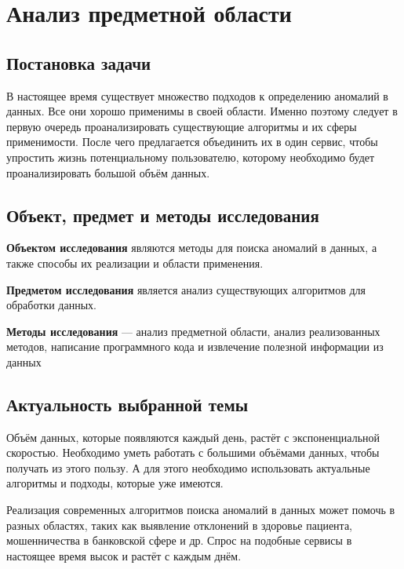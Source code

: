 \chapter{Анализ предметной области} \label{ch:ch1}

\section{Постановка задачи} \label{sec:ch1/sec1}

В настоящее время существует множество подходов к определению аномалий в данных. Все они хорошо применимы в своей области. Именно поэтому следует в первую очередь проанализировать существующие алгоритмы и их сферы применимости. После чего предлагается объединить их в один сервис, чтобы упростить жизнь потенциальному пользователю, которому необходимо будет проанализировать большой объём данных.

\clearpage

\section{Объект, предмет и методы исследования} \label{sec:ch1/sec2}

\textbf{Объектом исследования} являются методы для поиска аномалий в данных, а также способы их реализации и области применения.

\textbf{Предметом исследования} является анализ существующих алгоритмов для обработки данных.

\textbf{Методы исследования} — анализ предметной области, анализ реализованных методов, написание программного кода и извлечение полезной информации из данных

\clearpage

\section{Актуальность выбранной темы} \label{sec:ch1/sec3}

Объём данных, которые появляются каждый день, растёт с экспоненциальной скоростью. Необходимо уметь работать с большими объёмами данных, чтобы получать из этого пользу. А для этого необходимо использовать актуальные алгоритмы и подходы, которые уже имеются.

Реализация современных алгоритмов поиска аномалий в данных может помочь в разных областях, таких как выявление отклонений в здоровье пациента, мошенничества в банковской сфере и др. Спрос на подобные сервисы в настоящее время высок и растёт с каждым днём.

\clearpage